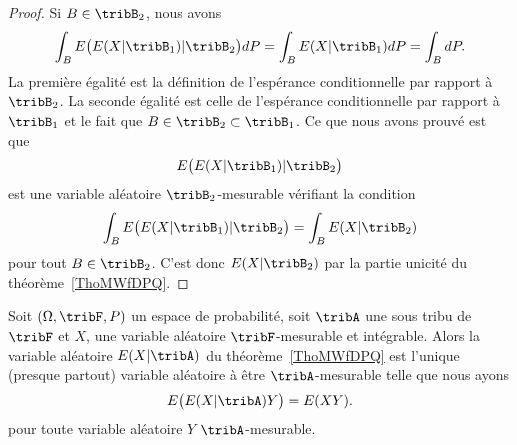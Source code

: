 \begin{proof}
	Si \( B\in\tribB_2\), nous avons
	\begin{equation}
		\int_BE\big( E(X|\tribB_1)|\tribB_2 \big)dP=\int_B E(X|\tribB_1)dP=\int_BdP.
	\end{equation}
	La première égalité est la définition de l'espérance conditionnelle par rapport à \( \tribB_2\). La seconde égalité est celle de l'espérance conditionnelle par rapport à \( \tribB_1\) et le fait que \( B\in\tribB_2\subset\tribB_1\). Ce que nous avons prouvé est que
	\begin{equation}
		E\big( E(X|\tribB_1)|\tribB_2 \big)
	\end{equation}
	est une variable aléatoire \( \tribB_2\)-mesurable vérifiant la condition
	\begin{equation}
		\int_BE\big( E(X|\tribB_1)|\tribB_2 \big)=\int_BE(X|\tribB_2)
	\end{equation}
	pour tout \( B\in \tribB_2\). C'est donc \( E(X|\tribB_2)\) par la partie unicité du théorème~\ref{ThoMWfDPQ}.
\end{proof}

\begin{proposition}
	Soit \( (\Omega,\tribF,P)\) un espace de probabilité, soit \( \tribA\) une sous tribu de \( \tribF\) et \( X\), une variable aléatoire \( \tribF\)-mesurable et intégrable. Alors la variable aléatoire \( E(X|\tribA)\) du théorème~\ref{ThoMWfDPQ} est l'unique (presque partout) variable aléatoire à être \( \tribA\)-mesurable telle que nous ayons
	\begin{equation}
		E\big( E(X|\tribA)Y \big)=E(XY).
	\end{equation}
	pour toute variable aléatoire \( Y\) \( \tribA\)-mesurable.
\end{proposition}


